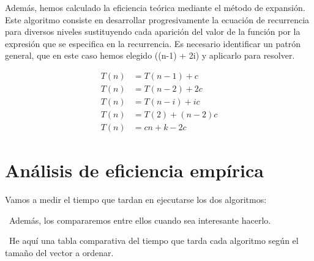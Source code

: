 \documentclass{article}
\begin{document}
	Además, hemos calculado la eficiencia teórica mediante el método de expansión. Este algoritmo consiste en desarrollar progresivamente la ecuación de recurrencia para diversos niveles sustituyendo cada aparición del valor de la función por la expresión que se especifica en la recurrencia. Es necesario identificar un patrón general, que en este caso hemos elegido ((n-1) + 2i) y aplicarlo para resolver.
	

\begin{align*}
	T(n) &= T(n-1) + c \\
	T(n) &= T(n-2) + 2c \\
	T(n) &= T(n-i) + ic \\
	T(n) &= T(2) + (n-2)c \\
	T(n) &= cn + k - 2c
\end{align*}
	\section{Análisis de eficiencia empírica}
	Vamos a medir el tiempo que tardan en ejecutarse los dos algoritmos:
	
	\
	Además, los compararemos entre ellos cuando sea interesante hacerlo.
	
	\
	He aquí una tabla comparativa del tiempo que tarda cada algoritmo según el tamaño del vector a ordenar.
	
\end{document}
